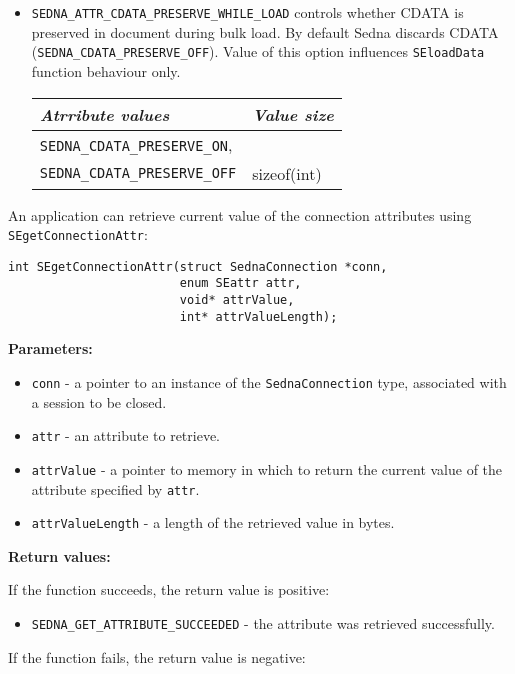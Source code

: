 \documentclass[a4paper,12pt]{article}
\newenvironment{citemize}
{\begin{itemize}
  \setlength{\itemsep}{0pt}
  \setlength{\parskip}{0pt}
  \setlength{\parsep}{0pt}}
{\end{itemize}}
\begin{document}
\begin{itemize}
\item\verb!SEDNA_ATTR_CDATA_PRESERVE_WHILE_LOAD! controls whether CDATA is
preserved in document during bulk load. By default Sedna discards CDATA
(\verb!SEDNA_CDATA_PRESERVE_OFF!). Value of this option influences
\verb!SEloadData! function behaviour only.

\begin{tabular}{|l|l|}
\hline
\emph{Atrribute values} & \emph{Value size} \\
\hline
\verb!SEDNA_CDATA_PRESERVE_ON!, & \\
\verb!SEDNA_CDATA_PRESERVE_OFF! & sizeof(int) \\
\hline
\end{tabular}
\end{itemize}

An application can retrieve current value of the connection attributes using
\verb!SEgetConnectionAttr!:

\begin{verbatim}
int SEgetConnectionAttr(struct SednaConnection *conn,
                        enum SEattr attr,
                        void* attrValue,
                        int* attrValueLength);
\end{verbatim}

\noindent
\textbf{Parameters:}

\begin{citemize}
\item\verb!conn! - a pointer to an instance of the \verb!SednaConnection! type,
associated with a session to be closed.
\item\verb!attr! - an attribute to retrieve.
\item\verb!attrValue! - a pointer to memory in which to return the current value
of the attribute specified by \verb!attr!.
\item\verb!attrValueLength! - a length of the retrieved value in bytes.
\end{citemize}

\noindent
\textbf{Return values:}

\medskip

\noindent
If the function succeeds, the return value is positive:

\begin{citemize}
\item\verb!SEDNA_GET_ATTRIBUTE_SUCCEEDED! - the attribute was retrieved
successfully.
\end{citemize}

\noindent
If the function fails, the return value is negative:
\end{document}
